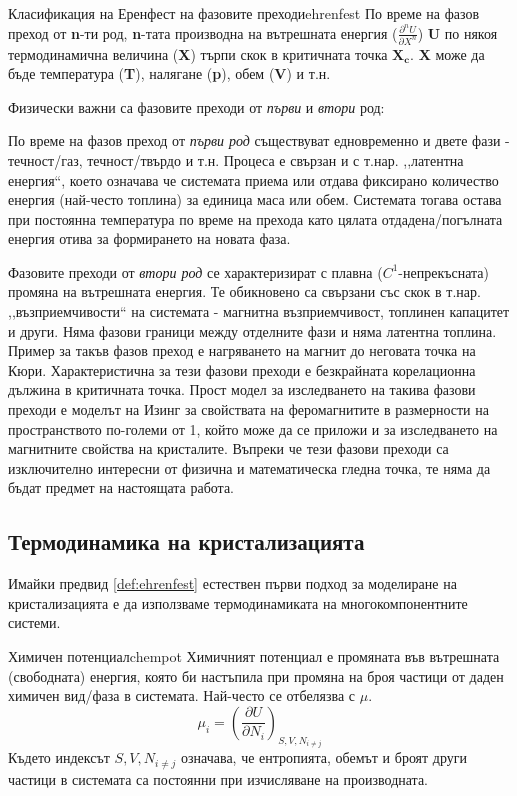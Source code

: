 \begin{definition}{Класификация на Еренфест на фазовите преходи}{ehrenfest}
	По време на фазов преход от \textbf{n}-ти род, \textbf{n}-тата производна на вътрешната енергия ($\frac{\partial^n U}{\partial X^n}$) \textbf{U} по някоя термодинамична величина (\textbf{X}) търпи скок в критичната точка $\boldsymbol{X_c}$. \textbf{X} може да бъде температура (\textbf{T}), налягане (\textbf{p}), обем (\textbf{V}) и т.н.
\end{definition}

\noindent Физически важни са фазовите преходи от \textit{първи} и \textit{втори} род:

По време на фазов преход от \textit{първи род} съществуват едновременно и двете фази - течност/газ, течност/твърдо и т.н. Процеса е свързан и с т.нар. ,,латентна енергия``, което означава че системата приема или отдава фиксирано количество енергия (най-често топлина) за единица маса или обем. Системата тогава остава при постоянна температура по време на прехода като цялата отдадена/погълната енергия отива за формирането на новата фаза.

Фазовите преходи от \textit{втори род} се характеризират с плавна ($C^1$-непрекъсната) промяна на вътрешната енергия. Те обикновено са свързани със скок в т.нар. ,,възприемчивости`` на системата - магнитна възприемчивост, топлинен капацитет и други. Няма фазови граници между отделните фази и няма латентна топлина. Пример за такъв фазов преход е нагряването на магнит до неговата точка на Кюри. Характеристична за тези фазови преходи е безкрайната корелационна дължина в критичната точка. Прост модел за изследването на такива фазови преходи е моделът на Изинг за свойствата на феромагнитите в размерности на пространството по-големи от 1, който може да се приложи и за изследването на магнитните свойства на кристалите. Въпреки че тези фазови преходи са изключително интересни от физична и математическа гледна точка, те няма да бъдат предмет на настоящата работа.

\subsection{Термодинамика на кристализацията}
\label{sub:thermodynamics}
Имайки предвид \autoref{def:ehrenfest} естествен първи подход за моделиране на кристализацията е да използваме термодинамиката на многокомпонентните системи.

\begin{definition}{Химичен потенциал}{chempot}
    Химичният потенциал е промяната във вътрешната (свободната) енергия, която би настъпила при промяна на броя частици от даден химичен вид/фаза в системата. Най-често се отбелязва с $\mu$.
	\begin{equation}
		\label{eq:chempot}
		\mu_i = \left(\frac{\partial U}{\partial N_i}\right)_{S, V, N_{i \ne j}}
	\end{equation}
	Където индексът $S, V, N_{i \ne j}$ означава, че ентропията, обемът и броят други частици в системата са постоянни при изчисляване на производната.
\end{definition}

